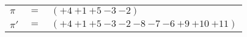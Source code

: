 \begin{example}\label{example:TCTQPMWV}
  \hfill \break
  \begin{tabular}{lll}
    $\pi$  & $=$ & $({+4}~{+1}~{+5}~{-3}~{-2})$ \\
    $\pi'$ & $=$ & $({+4}~{+1}~{+5}~{-3}~{-2}~{-8}~{-7}~{-6}~{+9}~{+10}~{+11})$ \\
  \end{tabular}
\end{example}